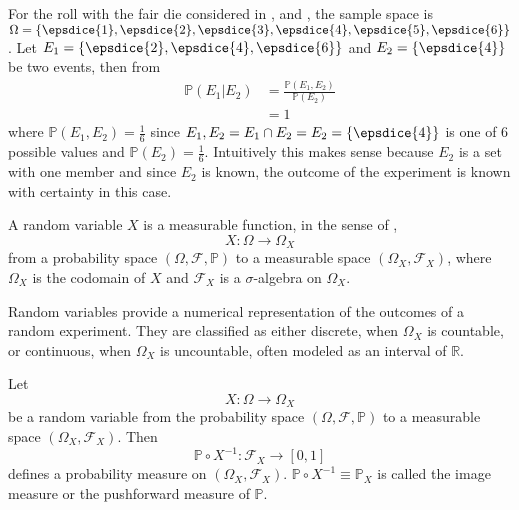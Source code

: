 \begin{example}
	For the roll with the fair die considered in ,  and , the sample space is $\Omega = \{ \epsdice{1}, \epsdice{2}, \epsdice{3}, \epsdice{4}, \epsdice{5}, \epsdice{6} \}$. Let $E_1 = \{\epsdice{2}, \epsdice{4}, \epsdice{6}\}$ and $E_2 = \{\epsdice{4}\}$ be two events, then from 
	\begin{equation}
		\begin{split}
			\mathbb{P}(E_1|E_2) &= \frac{\mathbb{P}(E_1, E_2)}{\mathbb{P}(E_2)}\\
			& = 1
		\end{split}
	\end{equation}
	where $\mathbb{P}(E_1,E_2)= \frac{1}{6}$ since $E_1,E_2 = E_1\cap E_2 = E_2=\{\epsdice{4}\}$ is one of $6$ possible values and $\mathbb{P}(E_2) = \frac{1}{6}$. Intuitively this makes sense because $E_2$ is a set with one member and since $E_2$ is known, the outcome of the experiment is known with certainty in this case.
\end{example}

\begin{definition}
	\label{def:random_Variable}
	A random variable $X$ is a measurable function, in the sense of ,
	\begin{equation}
		X: \Omega \to \Omega_X
	\end{equation}
	from a probability space $(\Omega, \mathcal{F}, \mathbb{P})$ to a measurable space $(\Omega_X, \mathcal{F}_X)$, where $\Omega_X$ is the codomain of $X$ and $\mathcal{F}_X$ is a $\sigma$-algebra on $\Omega_X$.
\end{definition}

\begin{remark}
	Random variables provide a numerical representation of the outcomes of a random experiment.  
	They are classified as either discrete, when $\Omega_X$ is countable, or continuous, when $\Omega_X$ is uncountable, often modeled as an interval of $\mathbb{R}$.
\end{remark}

\begin{definition}
	\label{def:image_measure}
	Let 
	\begin{equation}
		X: \Omega \to \Omega_X
	\end{equation}
	be a random variable from the probability space $(\Omega, \mathcal{F}, \mathbb{P})$ to a measurable space $(\Omega_X, \mathcal{F}_X)$. Then~\cite{drewitz2019introduction}
	\begin{equation}
		\mathbb{P}\circ X^{-1}: \mathcal{F}_X\to [0,1]
	\end{equation}
	defines a probability measure on $(\Omega_X, \mathcal{F}_X)$. $\mathbb{P}\circ X^{-1} \equiv \mathbb{P}_X$ is called the image measure or the pushforward measure of $\mathbb{P}$.
\end{definition}

